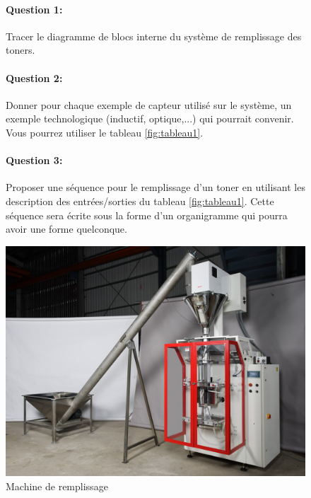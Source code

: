 \begin{figure}[htbp]
\begin{minipage}[c]{.55\linewidth}
\paragraph{Question 1:}

Tracer le diagramme de blocs interne du système de remplissage des toners.

\paragraph{Question 2:}

Donner pour chaque exemple de capteur utilisé sur le système, un exemple technologique (inductif, optique,...) qui pourrait convenir. Vous pourrez utiliser le tableau \ref{fig:tableau1}.

\paragraph{Question 3:}

Proposer une séquence pour le remplissage d'un toner en utilisant les description des entrées/sorties du tableau \ref{fig:tableau1}. Cette séquence sera écrite sous la forme d'un organigramme qui pourra avoir une forme quelconque.
\end{minipage}
\hfill
\begin{minipage}[c]{.40\linewidth}
\begin{center}
\includegraphics[width=0.9\linewidth]{img/machine.jpg}
\caption{Machine de remplissage}
\label{fig:image10}
\end{center}
\end{minipage}
\end{figure}

